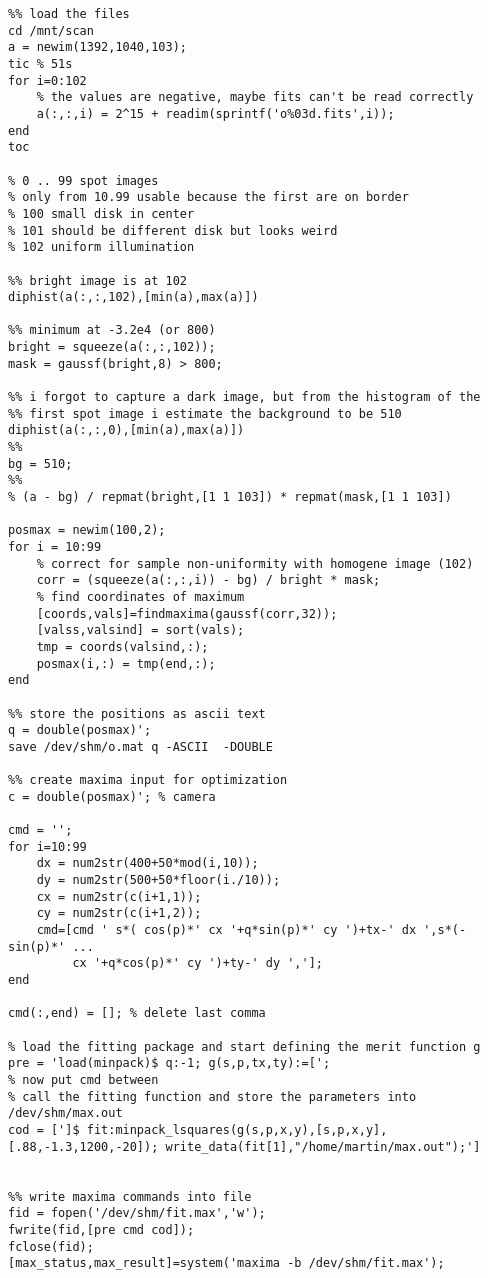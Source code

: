 {\small
\begin{verbatim}
%% load the files
cd /mnt/scan
a = newim(1392,1040,103);
tic % 51s
for i=0:102
    % the values are negative, maybe fits can't be read correctly
    a(:,:,i) = 2^15 + readim(sprintf('o%03d.fits',i));
end
toc

% 0 .. 99 spot images
% only from 10.99 usable because the first are on border
% 100 small disk in center
% 101 should be different disk but looks weird
% 102 uniform illumination

%% bright image is at 102
diphist(a(:,:,102),[min(a),max(a)])

%% minimum at -3.2e4 (or 800)
bright = squeeze(a(:,:,102));
mask = gaussf(bright,8) > 800;

%% i forgot to capture a dark image, but from the histogram of the
%% first spot image i estimate the background to be 510
diphist(a(:,:,0),[min(a),max(a)])   
%%
bg = 510;
%%
% (a - bg) / repmat(bright,[1 1 103]) * repmat(mask,[1 1 103])

posmax = newim(100,2);
for i = 10:99
    % correct for sample non-uniformity with homogene image (102)
    corr = (squeeze(a(:,:,i)) - bg) / bright * mask;
    % find coordinates of maximum
    [coords,vals]=findmaxima(gaussf(corr,32));
    [valss,valsind] = sort(vals);
    tmp = coords(valsind,:);
    posmax(i,:) = tmp(end,:);
end

%% store the positions as ascii text
q = double(posmax)';
save /dev/shm/o.mat q -ASCII  -DOUBLE

%% create maxima input for optimization
c = double(posmax)'; % camera

cmd = '';
for i=10:99
    dx = num2str(400+50*mod(i,10));
    dy = num2str(500+50*floor(i./10));
    cx = num2str(c(i+1,1));
    cy = num2str(c(i+1,2));
    cmd=[cmd ' s*( cos(p)*' cx '+q*sin(p)*' cy ')+tx-' dx ',s*(-sin(p)*' ...
         cx '+q*cos(p)*' cy ')+ty-' dy ','];
end

cmd(:,end) = []; % delete last comma

% load the fitting package and start defining the merit function g
pre = 'load(minpack)$ q:-1; g(s,p,tx,ty):=[';
% now put cmd between
% call the fitting function and store the parameters into /dev/shm/max.out
cod = [']$ fit:minpack_lsquares(g(s,p,x,y),[s,p,x,y],[.88,-1.3,1200,-20]); write_data(fit[1],"/home/martin/max.out");']


%% write maxima commands into file
fid = fopen('/dev/shm/fit.max','w');
fwrite(fid,[pre cmd cod]);
fclose(fid);
[max_status,max_result]=system('maxima -b /dev/shm/fit.max');


\end{verbatim}}

